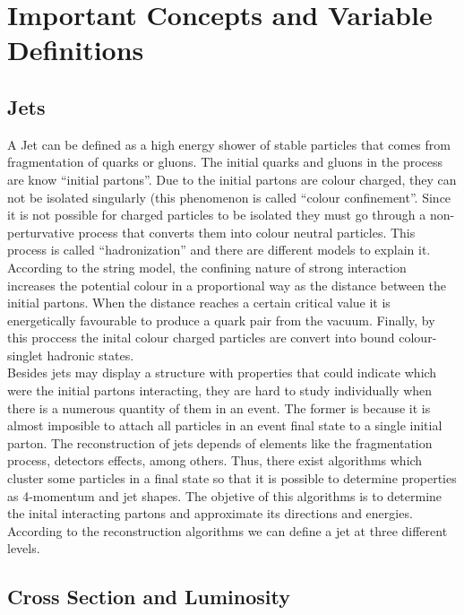  \chapter{Important Concepts and Variable Definitions}
 
 \section{Jets}
 A Jet can be defined as a high energy shower of stable particles that comes from fragmentation of quarks or gluons. The initial quarks and gluons in the process are know ``initial partons''.
 Due to the initial partons are colour charged, they can not be isolated singularly (this phenomenon is called ``colour confinement''. Since it is not possible for charged particles to be isolated 
 they must go through a non-perturvative process that converts them into colour neutral particles. This process is called ``hadronization'' and there are different models to explain it. According to 
 the string model, the confining nature of strong interaction increases the potential colour in a proportional way as the distance between the initial partons. When the distance reaches a certain 
 critical value it is energetically favourable to produce a quark pair from the vacuum. Finally, by this proccess the inital colour charged particles are convert into bound colour-singlet hadronic 
 states. \\
 
 Besides jets may display a structure with properties that could indicate which were the initial partons interacting, they are hard to study individually when there is a numerous quantity of them
 in an event. The former is because it is almost imposible to attach all particles in an event final state to a single initial parton. The reconstruction of jets depends of elements like the 
 fragmentation process, detectors effects, among others. Thus, there exist algorithms which cluster some particles in a final state so that it is possible to determine properties as 4-momentum 
 and jet shapes. The objetive of this algorithms is to determine the inital interacting partons and approximate its directions and energies. \\
 
 According to the reconstruction algorithms we can define a jet at three different levels.
 
 
 \section{Cross Section and Luminosity}
 
